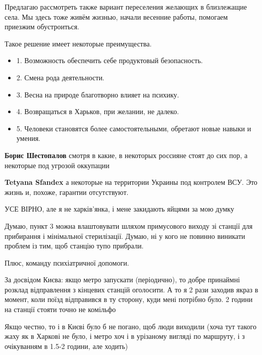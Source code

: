 \begin{itemize}

Предлагаю рассмотреть также вариант переселения желающих в близлежащие села. Мы
здесь тоже живём жизнью, начали весенние работы, помогаем приезжим
обустроиться.

Такое решение имеет некоторые преимущества.

\begin{itemize}
  \item 1. Возможность обеспечить себе продуктовый безопасность.
  \item 2. Смена рода деятельности.
  \item 3. Весна на природе благотворно влияет на психику.
  \item 4. Возвращаться в Харьков, при желании, не далеко.
  \item 5. Человеки становятся более самостоятельными, обретают новые навыки и умения.
\end{itemize}

\begin{itemize} %
\textbf{Борис Шестопалов} смотря в какие, в некоторых россияне стоят до сих пор, а некоторые под угрозой оккупации

\textbf{Tetyana Sfandex} а некоторые на территории Украины под контролем ВСУ. Это жизнь и, похоже, гарантии отсутствуют.
\end{itemize} %

УСЕ ВІРНО, але я не харків’янка, і мене закидають яйцями за мою думку


Думаю, пункт 3 можна влаштовувати шляхом примусового виходу зі станції для
прибирання і мінімальної стерилізації. Думаю, ні у кого не повинно виникати
проблем із тим, щоб станцію тупо прибрали.

Плюс, команду психіатричної допомоги.

За досвідом Києва: якщо метро запускати (періодично), то добре принаймні
розклад відправлення з кінцевих станцій оголосити. А то я 2 рази заходив якраз
в момент, коли поїзд відправився в ту сторону, куди мені потрібно було. 2
години на станції стояти точно не комільфо

\begin{itemize} %

Якщо честно, то і в Києві було б не погано, щоб люди виходили (хоча тут такого
жаху як в Харкові не було, і метро хоч і в урізаному вигляді по маршруту, і з
очікуванням в 1.5-2 години, але ходить)


\end{itemize}
\end{itemize}
